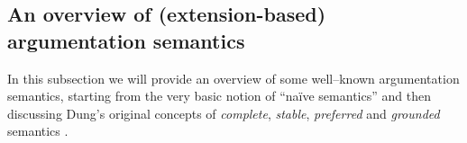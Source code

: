 \begin{comment}
The following three justification states refine this relatively rough classification aforementioned:



\begin{df}[justified/defeasible/overruled arguemnts]
    Given a semantics $\sigma$ and an AF $\mathcal{AF}$, 
    an argument $a$ is: 
    \begin{itemize}[itemsep=5pt,parsep=5pt,leftmargin=3em,topsep=5pt]
        \item 
        \textit{justified} iff $\forall E \in \mathcal{E}_\sigma (\mathcal{AF}): a \in E$; 
        \hfill (= skeptical justification)
        

        \item 
        \textit{defensible} iff $\exists E_1,E_2 \in \mathcal{E}_\sigma (\mathcal{AF}): a \in E_1, a \not\in E_2$;


        \item 
        \textit{overruled} iff $\forall E \in \mathcal{E}_\sigma(\mathcal{AF}): a \not\in E$. 
        \hfill ($a$ should be rejected)
    \end{itemize}
\end{df}


\end{comment}



\subsection{An overview of (extension-based) argumentation semantics}


In this subsection we  will provide an overview of some well--known argumentation semantics, 
starting from the very basic notion of ``na\"{i}ve semantics'' \cite[\S~3.2]{Bar.Cam.Gia2018} and then 
discussing Dung's original concepts of \textit{complete}, \textit{stable}, \textit{preferred} and \textit{grounded} semantics \cite{Dun1995}.


% 


